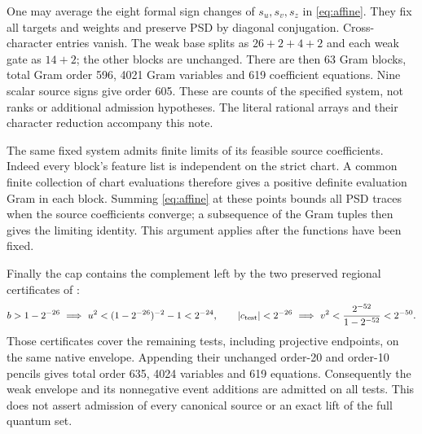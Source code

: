 \documentclass[10pt]{article}
\begin{document}
One may average the eight formal sign changes of $s_u,s_v,s_z$ in
\eqref{eq:affine}. They fix all targets and weights and preserve PSD by
diagonal conjugation. Cross-character entries vanish. The weak base splits
as $26+2+4+2$ and each weak gate as $14+2$; the other blocks are unchanged.
There are then 63 Gram blocks, total Gram order 596, 4021 Gram variables
and 619 coefficient equations. Nine scalar source signs give order 605.
These are counts of the specified system, not ranks or additional admission
hypotheses. The literal rational arrays and their character reduction
accompany this note.

The same fixed system admits finite limits of its feasible source coefficients.
Indeed every block's feature list is independent on the strict chart.
A common finite collection of chart evaluations therefore gives a positive
definite evaluation Gram in each block. Summing \eqref{eq:affine} at these
points bounds all PSD traces when the source coefficients converge; a
subsequence of the Gram tuples then gives the limiting identity.
This argument applies after the functions have been fixed.

Finally the cap contains the complement left by the two preserved regional
certificates of \cite{regional}:
\[
 b>1-2^{-26}\ \Longrightarrow\
 u^2<(1-2^{-26})^{-2}-1<2^{-24},\qquad
 |c_{\rm test}|<2^{-26}\ \Longrightarrow\
 v^2<\frac{2^{-52}}{1-2^{-52}}<2^{-50}.
\]
Those certificates cover the remaining tests, including projective endpoints,
on the same native envelope. Appending their unchanged order-20 and order-10
pencils gives total order 635, 4024 variables and 619 equations.
Consequently the weak envelope and its nonnegative event additions
are admitted on all tests. This does not assert
admission of every canonical source or an exact lift of the full quantum set.

\appendix
\end{document}
